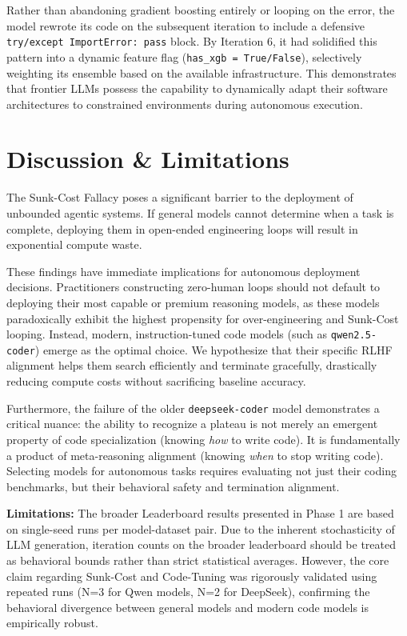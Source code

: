 \documentclass[11pt]{article}
\begin{document}
Rather than abandoning gradient boosting entirely or looping on the error, the model rewrote its code on the subsequent iteration to include a defensive \texttt{try/except ImportError: pass} block. By Iteration 6, it had solidified this pattern into a dynamic feature flag (\texttt{has\_xgb = True/False}), selectively weighting its ensemble based on the available infrastructure. This demonstrates that frontier LLMs possess the capability to dynamically adapt their software architectures to constrained environments during autonomous execution.

\section{Discussion \& Limitations}
\label{sec:discussion}

The Sunk-Cost Fallacy poses a significant barrier to the deployment of unbounded agentic systems. If general models cannot determine when a task is complete, deploying them in open-ended engineering loops will result in exponential compute waste.

These findings have immediate implications for autonomous deployment decisions. Practitioners constructing zero-human loops should not default to deploying their most capable or premium reasoning models, as these models paradoxically exhibit the highest propensity for over-engineering and Sunk-Cost looping. Instead, modern, instruction-tuned code models (such as \texttt{qwen2.5-coder}) emerge as the optimal choice. We hypothesize that their specific RLHF alignment helps them search efficiently and terminate gracefully, drastically reducing compute costs without sacrificing baseline accuracy.

Furthermore, the failure of the older \texttt{deepseek-coder} model demonstrates a critical nuance: the ability to recognize a plateau is not merely an emergent property of code specialization (knowing \emph{how} to write code). It is fundamentally a product of meta-reasoning alignment (knowing \emph{when} to stop writing code). Selecting models for autonomous tasks requires evaluating not just their coding benchmarks, but their behavioral safety and termination alignment.

\textbf{Limitations:} The broader Leaderboard results presented in Phase 1 are based on single-seed runs per model-dataset pair. Due to the inherent stochasticity of LLM generation, iteration counts on the broader leaderboard should be treated as behavioral bounds rather than strict statistical averages. However, the core claim regarding Sunk-Cost and Code-Tuning was rigorously validated using repeated runs (N=3 for Qwen models, N=2 for DeepSeek), confirming the behavioral divergence between general models and modern code models is empirically robust.
\end{document}
